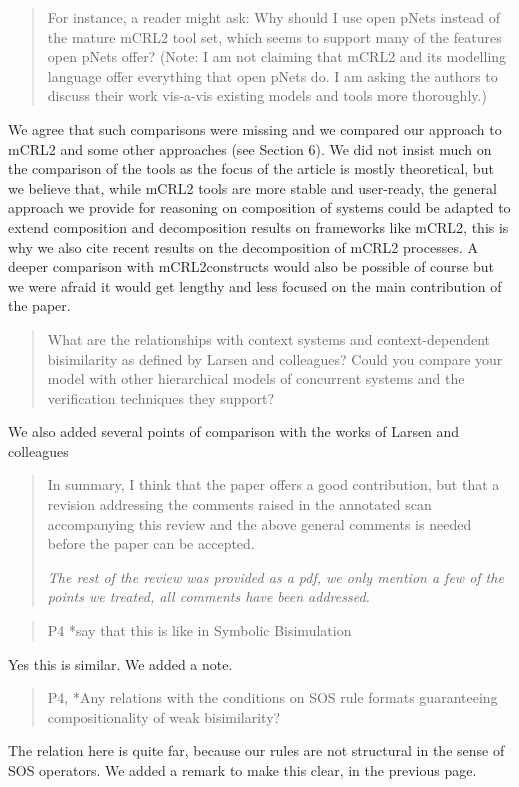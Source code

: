 \documentclass[10pt]{article}
\newenvironment{review}{\bgroup\itshape\begin{quote}}{\end{quote}\egroup}
\begin{document}
\begin{review}
For instance, a reader might ask: Why should I use open pNets instead of the mature mCRL2 tool set, which seems to support many of the features open pNets offer? (Note: I am not claiming that mCRL2 and its modelling language offer everything that open pNets
do. I am asking the authors to discuss their work vis-a-vis existing models and tools more thoroughly.) 
\end{review}
We agree that such comparisons were missing and we compared our approach to mCRL2 and some other approaches (see Section 6). We did not insist much on the comparison of the tools as the focus of the article is mostly theoretical, but we believe that, while mCRL2 tools are more stable and user-ready, the general approach we provide for reasoning on composition of systems could be adapted to extend composition and decomposition results on frameworks like mCRL2, this is why we also cite recent results on the decomposition of mCRL2 processes. A deeper comparison with mCRL2constructs  would also be possible of course but we were afraid it would get lengthy and less focused on the main contribution of the paper.

\begin{review}
What are the relationships with context systems and context-dependent bisimilarity as defined by Larsen and colleagues? Could you compare your model with other hierarchical models of concurrent systems and the verification techniques they support?
\end{review}
We also added several points of comparison with the works of Larsen and colleagues

\begin{review}

In summary, I think that the paper offers a good contribution, but that a revision addressing the comments raised in the annotated scan accompanying this review and the above general comments is needed before the paper can be accepted.

\emph{The rest of the review was provided as a pdf, we only mention a few of the points we treated, all comments have been addressed.}
\end{review}

\begin{review}
P4 *say that this is like in Symbolic Bisimulation
\end{review}
Yes this is similar. We added a note.

\begin{review}
P4, *Any relations with the conditions on SOS rule formats guaranteeing compositionality of weak bisimilarity?
\end{review}
 The relation here is quite far, because our rules are not structural in the sense of SOS operators. We added a remark to make this clear, in the previous page.
\end{document}
